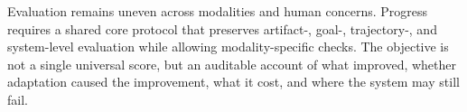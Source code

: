 \begin{keytakeaway}
Evaluation remains uneven across modalities and human concerns. Progress requires a shared core protocol that preserves artifact-, goal-, trajectory-, and system-level evaluation while allowing modality-specific checks. The objective is not a single universal score, but an auditable account of what improved, whether adaptation caused the improvement, what it cost, and where the system may still fail.
\end{keytakeaway}

